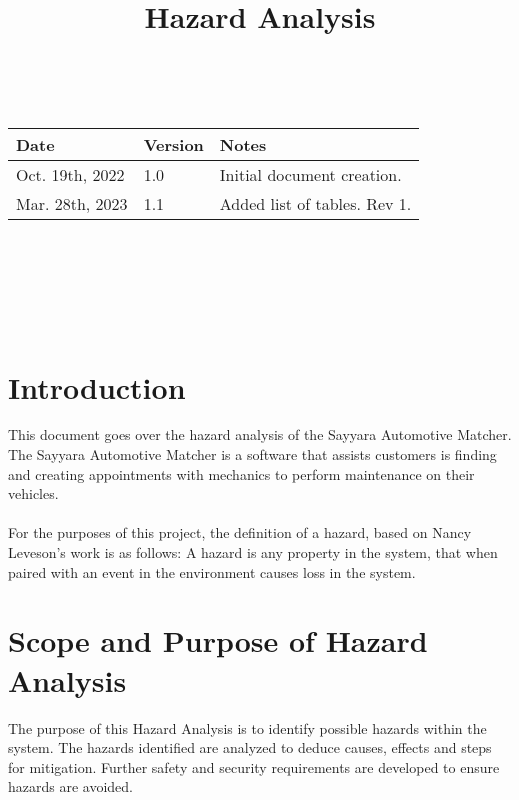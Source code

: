 \documentclass{article}
\title{Hazard Analysis\\\progname}
\author{\authname}
\date{}
\begin{document}
\maketitle
\thispagestyle{empty}

~\newpage


\begin{tabularx}{\textwidth}{p{3cm}p{2cm}X}
\toprule {\bf Date} & {\bf Version} & {\bf Notes}\\
\midrule
Oct. 19th, 2022 & 1.0 & Initial document creation.\\
Mar. 28th, 2023 & 1.1 & Added list of tables. Rev 1.\\
\bottomrule
\end{tabularx}
\\\\

~\newpage

\tableofcontents

\listoftables %


~\newpage



\section{Introduction}

This document goes over the hazard analysis of the Sayyara Automotive Matcher. The Sayyara Automotive Matcher is a software that assists customers is finding and creating appointments with mechanics to perform maintenance on their vehicles.
\\\\
\noindent For the purposes of this project, the definition of a hazard, based on Nancy Leveson's work is as follows: A hazard is any property in the system, that when paired with an event in the environment causes loss in the system.

\section{Scope and Purpose of Hazard Analysis}

The purpose of this Hazard Analysis is to identify possible hazards within the system. The hazards identified are analyzed to deduce causes, effects and steps for mitigation. Further safety and security requirements are developed to ensure hazards are avoided.   
\end{document}
